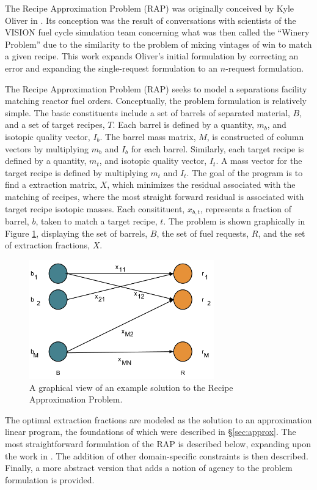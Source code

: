The Recipe Approximation Problem (RAP) was originally conceived by Kyle Oliver
in \cite{oliver_geniusv2:_2009}. Its conception was the result of conversations
with scientists of the VISION fuel cycle simulation team \cite{vision2009}
concerning what was then called the ``Winery Problem'' due to the similarity to
the problem of mixing vintages of win to match a given recipe. This work expands
Oliver's initial formulation by correcting an error and expanding the
single-request formulation to an $n$-request formulation.

The Recipe Approximation Problem (RAP) seeks to model a separations facility
matching reactor fuel orders. Conceptually, the problem formulation is
relatively simple. The basic constituents include a set of barrels of separated
material, $B$, and a set of target recipes, $T$. Each barrel is defined by a
quantity, $m_b$, and isotopic quality vector, $I_b$. The barrel mass matrix,
$M$, is constructed of column vectors by multiplying $m_b$ and $I_b$ for each
barrel. Similarly, each target recipe is defined by a quantity, $m_t$, and
isotopic quality vector, $I_t$. A mass vector for the target recipe is defined
by multiplying $m_t$ and $I_t$. The goal of the program is to find a extraction
matrix, $X$, which minimizes the residual associated with the matching of
recipes, where the most straight forward residual is associated with target
recipe isotopic masses. Each consitituent, $x_{b,t}$, represents a fraction of
barrel, $b$, taken to match a target recipe, $t$. The problem is shown
graphically in Figure \ref{fig:rap}, displaying the set of barrels, $B$, the set
of fuel requests, $R$, and the set of extraction fractions, $X$.

\begin{figure}[h]
  \begin{center}
    \includegraphics[width=8cm]{./chapters/research/rap.png}
  \caption{A graphical view of an example solution to the Recipe Approximation 
           Problem.}
  \label{fig:rap}
  \end{center}
\end{figure}

The optimal extraction fractions are modeled as the solution to an
approximation linear program, the foundations of which were described in
\S\ref{sec:approx}. The most straightforward formulation of 
the RAP is described below, expanding upon the work
in \cite{oliver_geniusv2:_2009}. The addition of other domain-specific
constraints is then described. Finally, a more abstract version that adds a
notion of agency to the problem formulation is provided.
